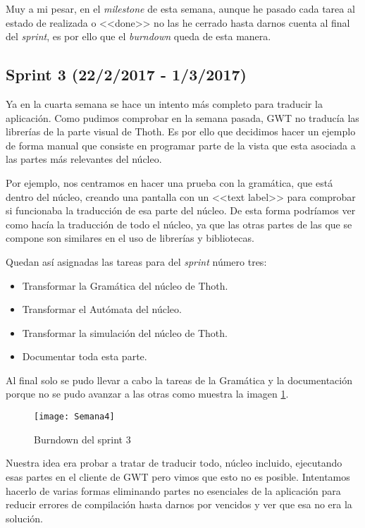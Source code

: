 Muy a mi pesar, en el \emph{milestone} de esta semana, aunque he pasado cada tarea al estado de realizada o <<done>> no las he cerrado hasta darnos cuenta al final del \emph{sprint}, es por ello que el \emph{burndown} queda de esta manera.


\subsection{Sprint 3 (22/2/2017 - 1/3/2017)}

Ya en la cuarta semana se hace un intento más completo para traducir la aplicación. Como pudimos comprobar en la semana pasada, GWT no traducía las librerías de la parte visual de Thoth. Es por ello que decidimos hacer un ejemplo de forma manual que consiste en programar parte de la vista que esta asociada a las partes más relevantes del núcleo.

Por ejemplo, nos centramos en hacer una prueba con la gramática, que está dentro del núcleo, creando una pantalla con un <<text label>> para comprobar si funcionaba la traducción de esa parte del núcleo. De esta forma podríamos ver como hacía la traducción de todo el núcleo, ya que las otras partes de las que se compone son similares en el uso de librerías y bibliotecas.

Quedan así asignadas las tareas para del \emph{sprint} número tres:

\begin{itemize}
\item Transformar la Gramática del núcleo de Thoth.
\item Transformar el Autómata del núcleo.
\item Transformar la simulación del núcleo de Thoth.
\item Documentar toda esta parte.
\end{itemize}

Al final solo se pudo llevar a cabo la tareas de la Gramática y la documentación porque no se pudo avanzar a las otras como muestra la imagen \ref{fig:A.2}.

\begin{figure}[h]
\centering
\texttt{[image: Semana4]}
\caption{Burndown del sprint 3}
\label{fig:A.2}
\end{figure}

 Nuestra idea era probar a tratar de traducir todo, núcleo incluido, ejecutando esas partes en el cliente de GWT  pero vimos que esto no es posible. Intentamos hacerlo de varias formas eliminando partes no esenciales de la aplicación para reducir errores de compilación hasta darnos por vencidos y ver que esa no era la solución.

